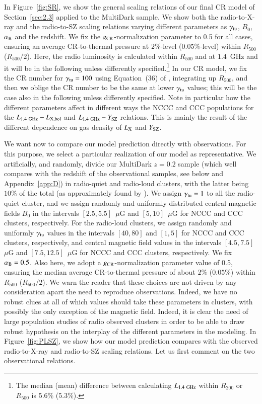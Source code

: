 \documentclass[traditabstract]{aa}
\newcommand{\rmn}{\mathrm}
\begin{document}
In Figure~\ref{fig:SR}, we show the general scaling relations of our final CR model of Section~\ref{sec:2.3} applied to the MultiDark sample. We show both the radio-to-X-ray  and the radio-to-SZ scaling relations varying different parameters as $\gamma_{\rm{tu}}$, $B_{0}$, $\alpha_{\rm{B}}$ and the redshift. We fix the $g_{\rm{CR}}$-normalization parameter to 0.5 for all cases, ensuring an average CR-to-thermal pressure at $2\%$-level ($0.05\%$-level) within $R_{500}$ ($R_{500}/2$). Here, the radio luminosity is calculated within $R_{500}$ and at $1.4$~GHz and it will be in the following unless differently specified.\footnote[14]{The median (mean) difference between calculating $L_{1.4~\rm{GHz}}$ within $R_{200}$ or $R_{500}$ is 5.6\% (5.3\%).} In our CR model, we fix the CR number for $\gamma_{\rm{tu}}=100$ using Equation~(36) of \cite{2011A&A...527A..99E}, integrating up $R_{500}$, and then we oblige the CR number to be the same at lower $\gamma_{\rm{tu}}$ values; this will be the case also in the following unless differently specified. Note in particular how the different parameters affect in different ways the NCCC and CCC populations for the $L_{1.4~\rmn{GHz}}-L_{\rm{X,bol}}$ and $L_{1.4~\rmn{GHz}}-Y_{\rm{SZ}}$ relations. This is mainly the result of the different dependence on gas density of $L_{\rm{X}}$ and $Y_{\rm{SZ}}$.

We want now to compare our model prediction directly with observations. For this purpose, we select a particular realization of our model as representative. We artificially, and randomly, divide our MultiDark $z=0.2$ sample (which well compares with the redshift of the observational samples, see below and Appendix~\ref{app:D}) in radio-quiet and radio-loud clusters, with the latter being $10\%$ of the total (as approximately found by \citealp{1999NewA....4..141G}). We assign $\gamma_{\rm{tu}}=1$ to all the radio-quiet cluster, and we assign randomly and uniformly distributed central magnetic fields $B_0$ in the intervals $[2.5,5.5]$~$\mu$G and $[5,10]$~$\mu$G for NCCC and CCC clusters, respectively. For the radio-loud clusters, we assign randomly and uniformly $\gamma_{\rm{tu}}$ values in the intervals $[40,80]$ and $[1,5]$ for NCCC and CCC clusters, respectively, and central magnetic field values in the intervals $[4.5,7.5]$~$\mu$G and $[7.5,12.5]$~$\mu$G for NCCC and CCC clusters, respectively. We fix $\alpha_{\rm{B}}=0.5$. Also here, we adopt a $g_{\rm{CR}}$-normalization parameter value of 0.5, ensuring the median average CR-to-thermal pressure of about $2\%$ ($0.05\%$) within $R_{500}$ ($R_{500}/2$). We warn the reader that these choices are not driven by any consideration apart the need to reproduce observations. Indeed, we have no robust clues at all of which values should take these parameters in clusters, with possibly the only exception of the magnetic field. Indeed, it is clear the need of large population studies of radio observed clusters in order to be able to draw robust hypothesis on the interplay of the different parameters in the modeling. In Figure~\ref{fig:PLSZ}, we show how our model prediction compares with the observed radio-to-X-ray and radio-to-SZ scaling relations. Let us first comment on the two observational relations.
\end{document}
